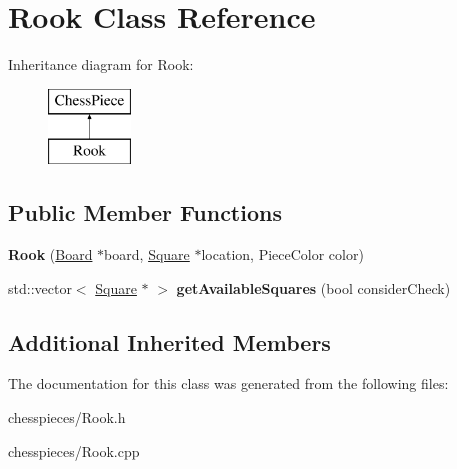 \hypertarget{class_rook}{}\section{Rook Class Reference}
\label{class_rook}
Inheritance diagram for Rook\+:\begin{figure}[H]
\begin{center}
\leavevmode
\includegraphics[height=2.000000cm]{class_rook}
\end{center}
\end{figure}
\subsection*{Public Member Functions}
\begin{DoxyCompactItemize}
\item 
\mbox{\label{class_rook_a1c333105bdc3590b6d8379f39041e0a7}} 
{\bfseries Rook} (\mbox{\hyperlink{class_board}{Board}} $\ast$board, \mbox{\hyperlink{class_square}{Square}} $\ast$location, Piece\+Color color)
\item 
\mbox{\label{class_rook_a8078bb9a0382116d2f7ac76d39ecc5d3}} 
std\+::vector$<$ \mbox{\hyperlink{class_square}{Square}} $\ast$ $>$ {\bfseries get\+Available\+Squares} (bool consider\+Check)
\end{DoxyCompactItemize}
\subsection*{Additional Inherited Members}


The documentation for this class was generated from the following files\+:\begin{DoxyCompactItemize}
\item 
chesspieces/Rook.\+h\item 
chesspieces/Rook.\+cpp\end{DoxyCompactItemize}
